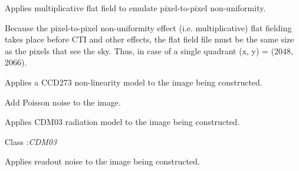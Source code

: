 \documentclass[a4paper,12pt,english]{sphinxmanual}
\begin{document}
\begin{fulllineitems}
\begin{fulllineitems}
\label{simulator:simulator.simulator.VISsimulator.applyFlatfield}
Applies multiplicative flat field to emulate pixel-to-pixel non-uniformity.

Because the pixel-to-pixel non-uniformity effect (i.e. multiplicative) flat fielding takes place
before CTI and other effects, the flat field file must be the same size as the pixels that see
the sky. Thus, in case of a single quadrant (x, y) = (2048, 2066).

\end{fulllineitems}


\begin{fulllineitems}
\label{simulator:simulator.simulator.VISsimulator.applyNonlinearity}
Applies a CCD273 non-linearity model to the image being constructed.

\end{fulllineitems}


\begin{fulllineitems}
\label{simulator:simulator.simulator.VISsimulator.applyPoissonNoise}
Add Poisson noise to the image.

\end{fulllineitems}


\begin{fulllineitems}
\label{simulator:simulator.simulator.VISsimulator.applyRadiationDamage}
Applies CDM03 radiation model to the image being constructed.




Class :\emph{CDM03}



\end{fulllineitems}


\begin{fulllineitems}
\label{simulator:simulator.simulator.VISsimulator.applyReadoutNoise}
Applies readout noise to the image being constructed.


\end{fulllineitems}
\end{fulllineitems}
\end{document}
